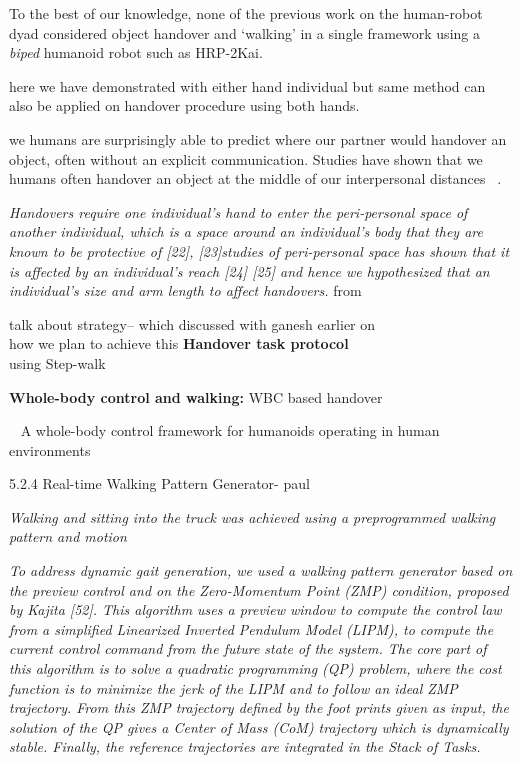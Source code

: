 To the best of our knowledge, none of the previous work on the human-robot dyad considered object handover and `walking' in a single framework using a \textit{biped} humanoid robot such as HRP-2Kai.


here we have demonstrated with either hand individual but same method can also be applied on handover procedure using both hands.

we humans are surprisingly able to predict where our partner would handover an object, often without an explicit communication. Studies have shown that we humans often handover an object at the middle of our interpersonal distances ~\cite{hansen2017human, kato2018humans, kato2019handovers}.


\textit{ Handovers require one individual’s hand to enter the peri-personal space of another individual, which is a space around an individual’s body that they are known to be protective of [22], [23]studies of peri-personal space has shown that it is affected by an individual’s reach [24] [25] and hence we hypothesized that an individual’s size and arm length to affect handovers. } from ~\cite{kato2019handovers}




talk about strategy-- which discussed with ganesh earlier on\\
how we plan to achieve this \textbf{Handover task protocol\\} using Step-walk

\textbf{Whole-body control and walking:} WBC based handover





~\cite{sentis2006whole}  A whole-body control framework for humanoids operating in human environments


5.2.4 Real-time Walking Pattern Generator- paul

\textit{Walking and sitting	into the truck was achieved using a preprogrammed walking pattern and motion}

\textit{To address dynamic gait generation, we used a walking pattern generator based on the preview control and on the Zero-Momentum Point (ZMP) condition, proposed by Kajita [52]. This algorithm uses a preview window to compute the control law from a simplified Linearized Inverted Pendulum Model (LIPM), to compute the current control command from the future state of the system. The core part of this algorithm is to solve a quadratic programming (QP) problem, where the cost function
is to minimize the jerk of the LIPM and to follow an ideal ZMP trajectory. From
this ZMP trajectory defined by the foot prints given as input, the solution of the QP
gives a Center of Mass (CoM) trajectory which is dynamically stable. Finally, the
reference trajectories are integrated in the Stack of Tasks.}

